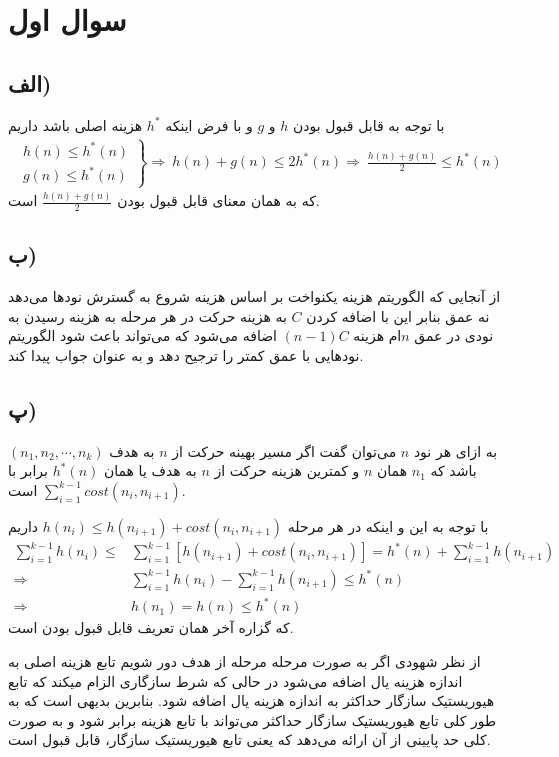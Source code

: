 \documentclass{article}
\begin{document}
\section*{سوال اول}
\subsection*{الف)}
با توجه به قابل قبول بودن $h$ و $g$ و با فرض اینکه 
$h^*$
هزینه اصلی باشد داریم
\begin{align*}
	\left.\begin{array}{l}
		h(n) \leq h^*(n)\\[1ex]
		g(n) \leq h^*(n)
	\end{array}\right\} \Longrightarrow\ h(n) + g(n) \leq 2 h^*(n) \Longrightarrow\ \frac{h(n) + g(n)}{2} \leq h^*(n)
\end{align*}
که به همان معنای قابل قبول بودن $ \frac{h(n) + g(n)}{2}$ است.

\subsection*{ب)}
از آنجایی که الگوریتم هزینه یکنواخت بر اساس هزینه شروع به گسترش نود‌ها می‌دهد نه عمق بنابر این با اضافه کردن $C$ به هزینه حرکت در هر مرحله به هزینه رسیدن به نودی در عمق $n$ام هزینه $(n-1)C$ اضافه می‌شود که می‌تواند باعث شود الگوریتم نود‌هایی با عمق کمتر را ترجیح دهد و به عنوان جواب پیدا کند.

\subsection*{پ)}
به ازای هر نود $n$ می‌توان گفت اگر مسیر بهینه حرکت از $n$ به هدف 
$(n_1, n_2, \cdots, n_k)$
باشد که $n_1$ همان $n$ و  کمترین هزینه حرکت از $n$ به هدف یا همان $h^*(n)$ برابر با
$\sum_{i=1}^{k-1} cost(n_i, n_{i+1})$
است.

با توجه به این و اینکه در هر مرحله
$h(n_i) \leq h(n_{i+1}) + cost(n_i, n_{i+1})$
داریم
\begin{align*}
\sum_{i=1}^{k-1} h(n_i) \leq &\sum_{i=1}^{k-1} \left[ h(n_{i+1}) + cost(n_i, n_{i+1}) \right] = h^*(n) + \sum_{i=1}^{k-1} h(n_{i+1}) \\
\Rightarrow\ &\sum_{i=1}^{k-1} h(n_i) - \sum_{i=1}^{k-1} h(n_{i+1}) \leq h^*(n) \\
\Rightarrow\ &h(n_1) = h(n) \leq h^*(n)
\end{align*}
که گزاره آخر همان تعریف قابل قبول بودن است.

از نظر شهودی اگر به صورت مرحله مرحله از هدف دور شویم تابع هزینه اصلی به اندازه هزینه یال اضافه می‌شود در حالی که شرط سازگاری الزام میکند که تابع هیوریستیک سازگار حداکثر به اندازه هزینه یال اضافه شود. بنابرین بدیهی است که به طور کلی تابع هیوریستیک سازگار حداکثر می‌تواند با تابع هزینه برابر شود و به صورت کلی حد پایینی از آن ارائه می‌دهد که یعنی تابع هیوریستیک سازگار، قابل قبول است.
\end{document}
